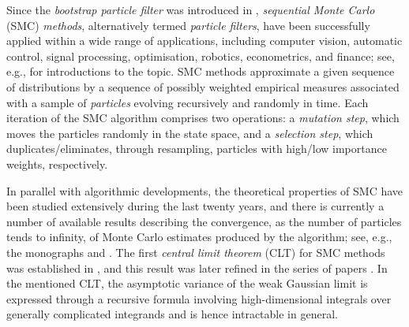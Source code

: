 Since the \emph{bootstrap particle filter} was introduced in \cite{gordon:salmond:smith:1993}, \emph{sequential Monte Carlo} (SMC) \emph{methods}, alternatively termed \emph{particle filters}, have been successfully applied within a wide range of applications, including computer vision, automatic control, signal processing, optimisation, robotics, econometrics, and finance; see, e.g.,  \cite{doucet:defreitas:gordon:2001,ristic:arulampalam:gordon:2004} for introductions to the topic. SMC methods approximate a given sequence of distributions by a sequence of possibly weighted empirical measures associated with a sample of \emph{particles} evolving recursively and randomly in time. Each iteration of the SMC algorithm comprises two operations: a \emph{mutation step}, which moves the particles randomly in the state space, and a \emph{selection step}, which duplicates/eliminates, through resampling, particles with high/low importance weights, respectively.  

In parallel with algorithmic developments, the theoretical properties of SMC have been studied extensively during the last twenty years, and there is currently a number of available results describing the convergence, as the number of particles tends to infinity, of Monte Carlo estimates produced by the algorithm; see, e.g., the monographs \cite{delmoral:2004,delmoral:2013} and \cite[Chapter~9]{cappe:moulines:ryden:2005}. The first \emph{central limit theorem} (CLT) for SMC methods was established in \cite{delmoral:guionnet:1999}, and this result was later refined in the series of papers \cite{chopin:2004,kuensch:2005,douc:moulines:2008}. In the mentioned CLT, the asymptotic variance of the weak Gaussian limit is expressed through a recursive formula involving high-dimensional integrals over generally complicated integrands and is hence intractable in general. 

